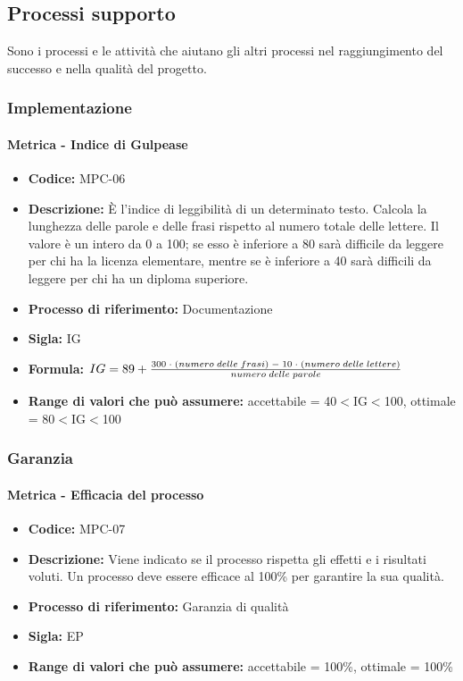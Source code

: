 \subsection{Processi supporto}
Sono i processi e le attività che aiutano gli altri processi nel raggiungimento del successo e nella qualità del progetto.
  
\subsubsection{Implementazione}
    \paragraph{Metrica - Indice di Gulpease}
    \begin{itemize}
        \item \textbf{Codice:} MPC-06
        \item \textbf{Descrizione:} È l'indice di leggibilità di un determinato testo. Calcola la lunghezza delle parole e delle frasi rispetto al numero totale delle lettere. Il valore è un intero da 0 a 100; se esso è inferiore a 80 sarà difficile da leggere per chi ha la licenza elementare, mentre se è inferiore a 40 sarà difficili da leggere per chi ha un diploma superiore.
        \item \textbf{Processo di riferimento:} Documentazione
        \item \textbf{Sigla:} IG
        \item \textbf{Formula:} \begin{math}{IG = 89 + {{300 \; \cdot \; (numero\; delle \; frasi) \; - \; 10 \; \cdot \; (numero \; delle \; lettere)}\over numero \; delle \; parole}}\end{math}
        \item \textbf{Range di valori che può assumere:} accettabile = 40$<$IG$<$100, ottimale = 80$<$IG$<$100
    \end{itemize}

\subsubsection{Garanzia}
    \paragraph{Metrica - Efficacia del processo}
    \begin{itemize}
        \item \textbf{Codice:} MPC-07
        \item \textbf{Descrizione:} Viene indicato se il processo rispetta gli effetti e i risultati voluti. Un processo deve essere efficace al 100\% per garantire la sua qualità.
        \item \textbf{Processo di riferimento:} Garanzia di qualità
        \item \textbf{Sigla:} EP
        \item \textbf{Range di valori che può assumere:} accettabile = 100\%, ottimale = 100\%
    \end{itemize}

